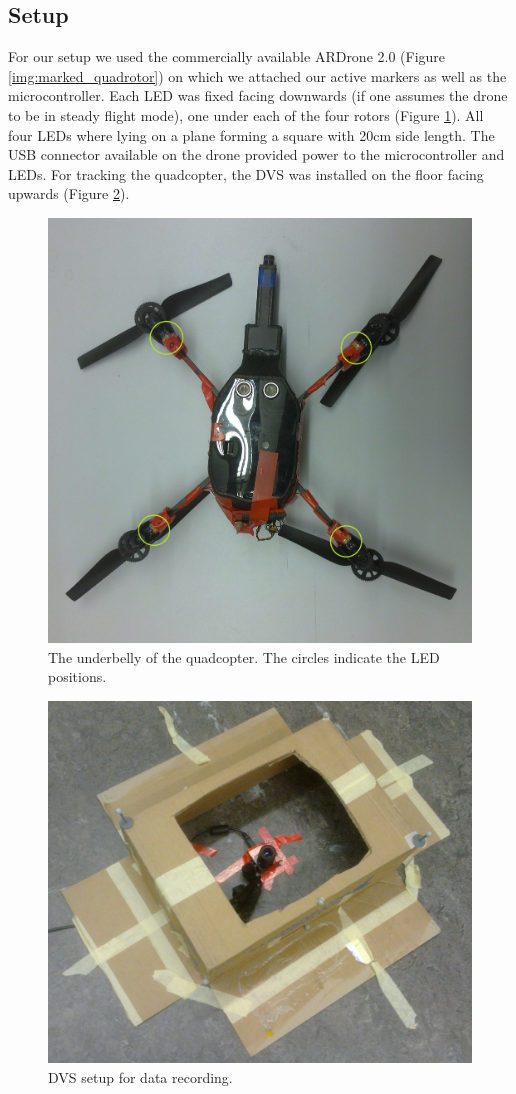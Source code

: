 \subsection{Setup}\label{sec:experimentalsetup}

For our setup we used the commercially available ARDrone 2.0 (Figure \ref{img:marked_quadrotor}) on which we attached our active markers as well as the microcontroller. Each LED was fixed facing downwards (if one assumes the drone to be in steady flight mode), one under each of the four rotors (Figure \ref{img:quadcopter_belly}). All four LEDs where lying on a plane forming a square with 20cm side length. The USB connector available on the drone provided power to the microcontroller and LEDs. For tracking the quadcopter, the DVS was installed on the floor facing upwards (Figure \ref{img:dvs_ground}).

\begin{figure}[h]
     \centering
     \includegraphics[height=0.5\textwidth]{img/quadcopter_belly.jpg}
     \caption{The underbelly of the quadcopter. The circles indicate the LED positions.}
     \label{img:quadcopter_belly}
\end{figure}

\begin{figure}[h]
     \centering
     \includegraphics[height=0.5\textwidth]{img/dvs_ground.jpg}
     \caption{DVS setup for data recording.}
     \label{img:dvs_ground}
\end{figure}


